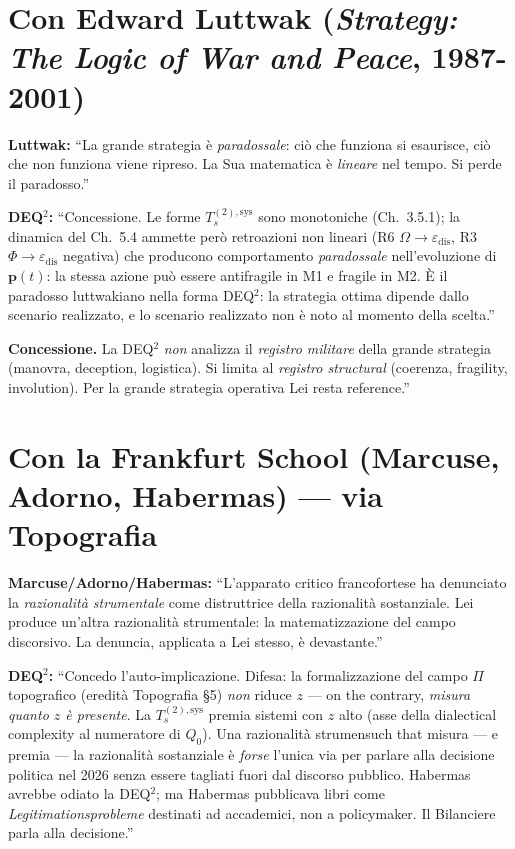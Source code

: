 \section{\texorpdfstring{Con Edward Luttwak (\emph{Strategy: The Logic
of War and Peace},
1987-2001)}{Con Edward Luttwak (Strategy: The Logic of War and Peace, 1987-2001)}}\label{con-edward-luttwak-strategy-the-logic-of-war-and-peace-1987-2001}

\textbf{Luttwak:} ``La grande strategia è \emph{paradossale}: ciò che
funziona si esaurisce, ciò che non funziona viene ripreso. La Sua
matematica è \emph{lineare} nel tempo. Si perde il paradosso.''

\textbf{DEQ$^2$:} ``Concessione. Le forme \(T_s^{(2),\text{sys}}\) sono
monotoniche (Ch.~3.5.1); la dinamica del Ch.~5.4 ammette però
retroazioni non lineari (R6 \(\Omega \to \varepsilon_{\text{dis}}\), R3
\(\Phi \to \varepsilon_{\text{dis}}\) negativa) che producono
comportamento \emph{paradossale} nell'evoluzione di
\(\boldsymbol{p}(t)\): la stessa azione può essere antifragile in M1 e
fragile in M2. È il paradosso luttwakiano nella forma DEQ$^2$: la strategia
ottima dipende dallo scenario realizzato, e lo scenario realizzato non è
noto al momento della scelta.''

\textbf{Concessione.} La DEQ$^2$ \emph{non} analizza il \emph{registro
militare} della grande strategia (manovra, deception, logistica). Si
limita al \emph{registro structural} (coerenza, fragility,
involution). Per la grande strategia operativa Lei resta reference.''



\section{Con la Frankfurt School (Marcuse, Adorno, Habermas) ---
via
Topografia}\label{con-la-scuola-di-francoforte-marcuse-adorno-habermas-via-topografia}

\textbf{Marcuse/Adorno/Habermas:} ``L'apparato critico francofortese ha
denunciato la \emph{razionalità strumentale} come distruttrice della
razionalità sostanziale. Lei produce un'altra razionalità strumentale:
la matematizzazione del campo discorsivo. La denuncia, applicata a Lei
stesso, è devastante.''

\textbf{DEQ$^2$:} ``Concedo l'auto-implicazione. Difesa: la formalizzazione
del campo \(\Pi\) topografico (eredità Topografia \S{}5) \emph{non} riduce
\(z\) --- on the contrary, \emph{misura quanto \(z\) è presente}. La
\(T_s^{(2),\text{sys}}\) premia sistemi con \(z\) alto (asse della
dialectical complexity al numeratore di \(Q_0\)). Una razionalità
strumensuch that misura --- e premia --- la razionalità sostanziale è
\emph{forse} l'unica via per parlare alla decisione politica nel 2026
senza essere tagliati fuori dal discorso pubblico. Habermas avrebbe
odiato la DEQ$^2$; ma Habermas pubblicava libri come
\emph{Legitimationsprobleme} destinati ad accademici, non a policymaker.
Il Bilanciere parla alla decisione.''

